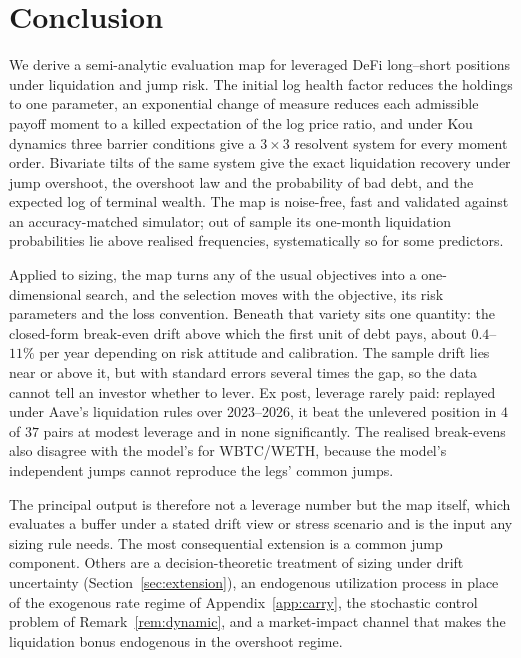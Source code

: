 \documentclass[11pt]{article}
\theoremstyle{plain}
\theoremstyle{definition}
\theoremstyle{remark}
\begin{document}
\section{Conclusion}\label{sec:conclusion}

We derive a semi-analytic evaluation map for leveraged DeFi long--short positions under
liquidation and jump risk. The initial log health factor reduces the holdings to one parameter, an
exponential change of measure reduces each admissible payoff moment to a killed expectation of the
log price ratio, and under Kou dynamics three barrier conditions give a $3\times3$ resolvent system
for every moment order. Bivariate tilts of the same system give the exact liquidation recovery under
jump overshoot, the overshoot law and the probability of bad debt, and the expected log of terminal
wealth. The map is noise-free, fast and validated against an accuracy-matched simulator; out of
sample its one-month liquidation probabilities lie above realised frequencies, systematically so for
some predictors.

Applied to sizing, the map turns any of the usual objectives into a one-dimensional search, and the
selection moves with the objective, its risk parameters and the loss convention. Beneath that
variety sits one quantity: the closed-form break-even drift above which the first unit of debt pays,
about $0.4$--$11\%$ per year depending on risk attitude and calibration. The sample drift lies near
or above it, but with standard errors several times the gap, so the data cannot tell an investor
whether to lever. Ex post, leverage rarely paid: replayed under Aave's liquidation rules over
2023--2026, it beat the unlevered position in $4$ of $37$ pairs at modest leverage and in none
significantly. The realised break-evens also disagree with the model's for WBTC/WETH, because the
model's independent jumps cannot reproduce the legs' common jumps.

The principal output is therefore not a leverage number but the map itself, which evaluates a buffer
under a stated drift view or stress scenario and is the input any sizing rule needs. The most
consequential extension is a common jump component. Others are a decision-theoretic treatment of
sizing under drift uncertainty (Section~\ref{sec:extension}), an endogenous utilization process in
place of the exogenous rate regime of Appendix~\ref{app:carry}, the stochastic control problem of
Remark~\ref{rem:dynamic}, and a market-impact channel that makes the liquidation bonus endogenous
in the overshoot regime.
\end{document}
